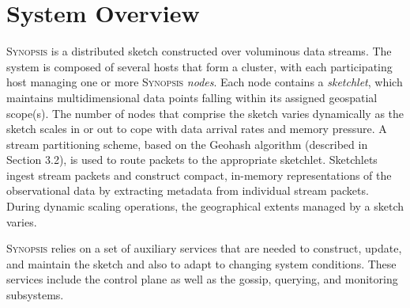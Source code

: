 \section{System Overview}
\label{sec:system}
\textsc{Synopsis} is a distributed sketch constructed over voluminous data streams.
The system is composed of several hosts that form a cluster, with each participating host managing one or more \textsc{Synopsis} \emph{nodes}.
Each node contains a \emph{sketchlet}, which maintains multidimensional data points falling within its assigned geospatial scope(s).
The number of nodes that comprise the sketch varies dynamically as the sketch scales in or out to cope with data arrival rates and memory pressure.
A stream partitioning scheme, based on the Geohash algorithm (described in Section 3.2), is used to route packets to the appropriate sketchlet.
Sketchlets ingest stream packets and construct compact, in-memory representations of the observational data by extracting metadata from individual stream packets.
During dynamic scaling operations, the geographical extents managed by a sketch varies.

\textsc{Synopsis} relies on a set of auxiliary services that are needed to construct, update, and maintain the sketch and also to adapt to changing system conditions.
These services include the control plane as well as the gossip, querying, and monitoring subsystems.

